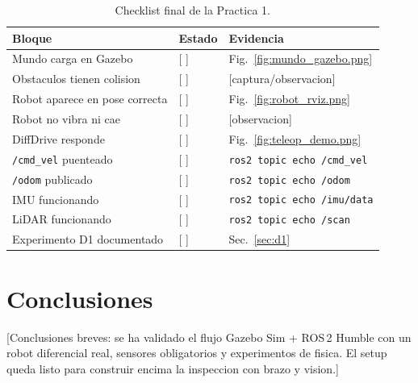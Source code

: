 \documentclass[11pt,a4paper]{article}
\begin{document}
\begin{table}[H]
  \centering
  \caption{Checklist final de la Practica 1.}
  \label{tab:checklist}
  \begin{tabularx}{\linewidth}{Xll}
    \toprule
    Bloque & Estado & Evidencia \\
    \midrule
    Mundo carga en Gazebo            & [ ] & Fig.~\ref{fig:mundo_gazebo.png} \\
    Obstaculos tienen colision       & [ ] & [captura/observacion] \\
    Robot aparece en pose correcta   & [ ] & Fig.~\ref{fig:robot_rviz.png} \\
    Robot no vibra ni cae            & [ ] & [observacion] \\
    DiffDrive responde               & [ ] & Fig.~\ref{fig:teleop_demo.png} \\
    \texttt{/cmd\_vel} puenteado     & [ ] & \texttt{ros2 topic echo /cmd\_vel} \\
    \texttt{/odom} publicado         & [ ] & \texttt{ros2 topic echo /odom} \\
    IMU funcionando                  & [ ] & \texttt{ros2 topic echo /imu/data} \\
    LiDAR funcionando                & [ ] & \texttt{ros2 topic echo /scan} \\
    Experimento D1 documentado       & [ ] & Sec.~\ref{sec:d1} \\
    \bottomrule
  \end{tabularx}
\end{table}

\section{Conclusiones}
\label{sec:conclusiones}

[Conclusiones breves: se ha validado el flujo Gazebo Sim + ROS\,2 Humble con
un robot diferencial real, sensores obligatorios y experimentos de fisica.
El setup queda listo para construir encima la inspeccion con brazo y vision.]
\end{document}
